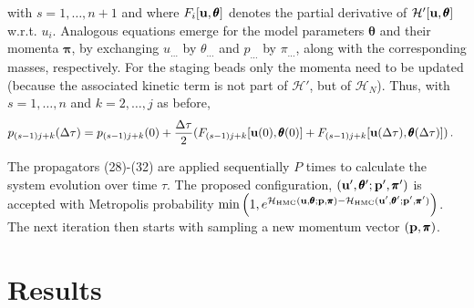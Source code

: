 \documentclass[11pt]{article}
\newcommand{\vc}[1]{{\bf #1 }}
\theoremstyle{definition}
\newcommand{\bt}{\pmb\theta}
\begin{document}
with $s=1,\dots,n+1$ and where $F_i[\vc u,{\pmb\theta}]$ denotes the partial derivative of $\mathcal H'[\vc u,{\pmb\theta}]$ w.r.t. $u_i$.
Analogous equations emerge for the model parameters $\bt$ and their momenta ${\pmb\pi}$, by exchanging $u_{…}$ by $\theta_{…}$ and $p_{…}$ by $\pi_{…}$, along with the corresponding masses, respectively.
For the staging beads
only the momenta need to be updated (because the associated kinetic term is not part of $\mathcal H'$, but of $\mathcal H_N$).
Thus, with $s=1,\dots,n$ and $k=2,\dots,j$ as before,
\begin{align}
  p_{(s-1)j+k}(\Delta\tau)
  &=
  p_{(s-1)j+k}(0)
  +
  \frac{\Delta\tau}{2}
  (
  F_{(s-1)j+k}[\vc u(0),{\pmb\theta}(0)]
  +
  F_{(s-1)j+k}[\vc u(\Delta\tau),{\pmb\theta}(\Delta\tau)]
  )
  \,.
\end{align}

The propagators (28)-(32) are applied sequentially $P$ times to calculate the system evolution over time $\tau$. The proposed configuration, $(\vc u',\bt';\vc p',{\pmb\pi}')$ is accepted with Metropolis probability $  \min
  \left(
    1,
    e^{\mathcal{H}_{\mbox{\tiny HMC}}(\vc u,\bt;\vc p,{\pmb\pi}) - \mathcal{H}_{\mbox{\tiny HMC}}(\vc u',\bt';\vc p',{\pmb\pi}')}
  \right)$.
The next iteration then starts with sampling a new momentum vector $(\vc p,{\pmb\pi})$.

\section{Results}\label{numerical_results}
\end{document}
